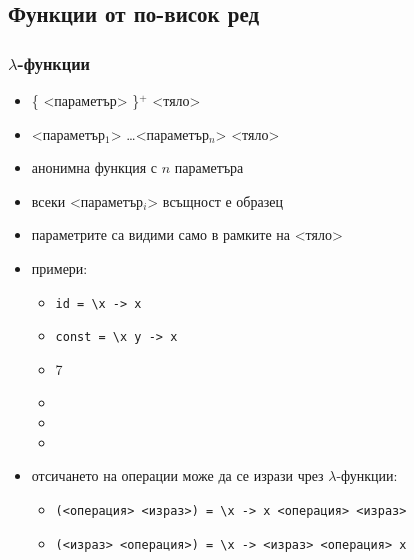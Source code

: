 \documentclass{beamer}
\begin{document}
\subsection{Функции от по-висок ред}
\begin{frame}
  \frametitle{$\lambda$-функции}  \begin{itemize}[<+->]
  \item \tta{\textbackslash}\{ <параметър> \}$^+$ \tta{->} <тяло>
  \item \tta{\textbackslash} <параметър$_1$> \ldots <параметър$_n$> \tta{->} <тяло>
  \item анонимна функция с $n$ параметъра
  \item всеки <параметър$_i$> всъщност е образец
  \item параметрите са видими само в рамките на <тяло>
  \item примери:
    \begin{itemize}
    \item \tt{id = \textbackslash x -> x}
    \item \tt{const = \textbackslash x y -> x}
    \item {}7
    \item {}
    \item {}
    \item {}
    \end{itemize}
  \item отсичането на операции може да се изрази чрез $\lambda$-функции:
    \begin{itemize}
    \item \tt(<операция> <израз>\tt) = \tt{\textbackslash x -> x} <операция> <израз>
    \item \tt(<израз> <операция>\tt) = \tt{\textbackslash x ->}  <израз> <операция> \tt x
    \end{itemize}
  \end{itemize}
\end{frame}
\end{document}
